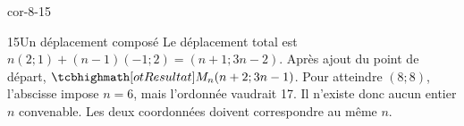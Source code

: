 \begin{blocLivre}{cor-8-15}
\begin{corrige}{15}{Un déplacement composé}
Le déplacement total est $n(2;1)+(n-1)(-1;2)=(n+1;3n-2)$. Après ajout du point de départ, $\res{M_n(n+2;3n-1)}$. Pour atteindre $(8;8)$, l’abscisse impose $n=6$, mais l’ordonnée vaudrait 17. Il n’existe donc aucun entier $n$ convenable. Les deux coordonnées doivent correspondre au même $n$.
\label{fig-cor-8-15}
\end{corrige}
\end{blocLivre}
